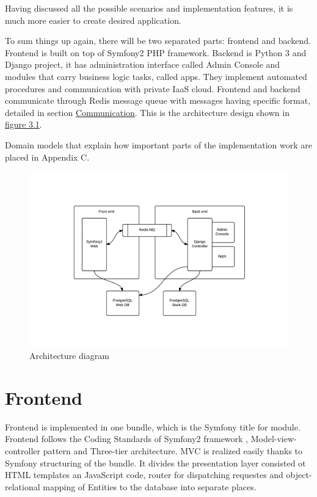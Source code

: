 \documentclass[thesis=B,english]{FITthesis}[2013/04/26]
\begin{document}
Having discussed all the possible scenarios and implementation features, it is much more easier to create desired application.

To sum things up again, there will be two separated parts: frontend and backend. Frontend is built on top of Symfony2 PHP framework. Backend is Python 3 and Django project, it has administration interface called Admin Console and modules that carry business logic tasks, called apps. They implement automated procedures and communication with private IaaS cloud. Frontend and backend communicate through Redis message queue with messages having specific format, detailed in section \hyperref[section:communication]{Communication}. This is the architecture design shown in \hyperref[TODO]{figure 3.1}.

Domain models that explain how important parts of the implementation work are placed in Appendix C.

\begin{figure}[h!]
	\includegraphics[trim=3.2cm 2cm 3cm 2.5cm, clip=true, totalheight=260pt]{images/tndw-arch.pdf}
	\caption{Architecture diagram}
	\label{fig: tndw-arch}
\end{figure}


\section{Frontend}

Frontend is implemented in one bundle, which is the Symfony title for module. Frontend follows the Coding Standards of Symfony2 framework \cite{symfony_conventions}, Model-view-controller pattern and Three-tier architecture. MVC is realized easily thanks to Symfony structuring of the bundle. It divides the presentation layer consisted ot HTML templates an JavaScript code, router for dispatching requestes and object-relational mapping of Entities to the database into separate places.
\end{document}
